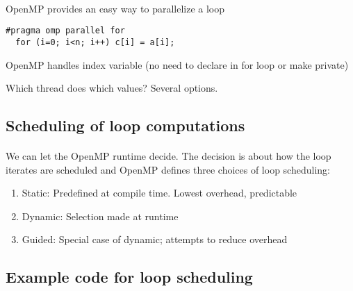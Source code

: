 \documentclass[%
oneside,                 %
final,                   %
10pt]{article}
\begin{document}
\paragraph{}
OpenMP provides an easy way to parallelize a loop



\begin{verbatim}
#pragma omp parallel for
  for (i=0; i<n; i++) c[i] = a[i];

\end{verbatim}

OpenMP handles index variable (no need to declare in for loop or make private)

Which thread does which values?  Several options.



\subsection*{Scheduling of  loop computations}


\paragraph{}
We can let  the OpenMP runtime decide. The decision is about how the loop iterates are scheduled
and  OpenMP defines three choices of loop scheduling:
\begin{enumerate}
\item Static: Predefined at compile time. Lowest overhead, predictable

\item Dynamic: Selection made at runtime 

\item Guided: Special case of dynamic; attempts to reduce overhead
\end{enumerate}

\noindent



\subsection*{Example code for loop scheduling}

\paragraph{}
\end{document}
